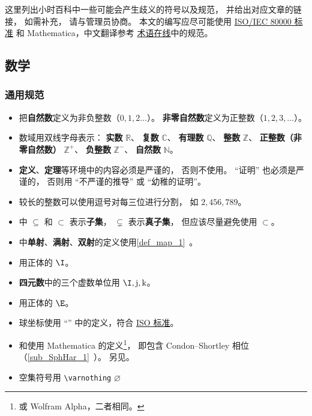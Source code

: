 
这里列出小时百科中一些可能会产生歧义的符号以及规范， 并给出对应文章的链接， 如需补充， 请与管理员协商。 本文的编写应尽可能使用 \href{https://en.wikipedia.org/wiki/ISO/IEC_80000}{ISO/IEC 80000 标准} 和 Mathematica，中文翻译参考 \href{https://www.termonline.cn/about}{术语在线}中的规范。

\subsection{数学}
\subsubsection{通用规范}
\begin{itemize}
\item 把\textbf{自然数}定义为非负整数（$0,1,2\dots$）。 \textbf{非零自然数}定义为正整数（$1,2,3,\dots$）。
\item 数域用双线字母表示： \textbf{实数} $\mathbb R$、 \textbf{复数} $\mathbb C$、 \textbf{有理数} $\mathbb Q$、 \textbf{整数} $\mathbb Z$、 \textbf{正整数（非零自然数）} $\mathbb Z^+$、 \textbf{负整数} $\mathbb Z^-$、 \textbf{自然数} $\mathbb N$。%
\item \textbf{定义}、\textbf{定理}等环境中的内容必须是严谨的， 否则不使用。 “证明” 也必须是严谨的， 否则用 “不严谨的推导” 或 “幼稚的证明”。
\item 较长的整数可以使用逗号对每三位进行分割， 如 $2,456,789$。
\item {}中 $\subseteq$ 和 $\subset$ 表示\textbf{子集}， $\subsetneq$ 表示\textbf{真子集}， 但应该尽量避免使用 $\subset$。
\item {}中\textbf{单射}、\textbf{满射}、\textbf{双射}的定义使用\autoref{def_map_1}~。
\item {} 用正体的 $\I$。
\item \textbf{四元数}中的三个虚数单位用 $\I, \mathrm{j}, \mathrm{k}$。
\item {} 用正体的 $\E$。
\item 球坐标使用 “” 中的定义，符合 \href{https://www.iso.org/standard/64973.html}{ISO 标准}。
\item {}和使用 Mathematica 的定义\footnote{或 Wolfram Alpha，二者相同。}， 即包含 Condon–Shortley 相位（\autoref{sub_SphHar_1}~）。 另见。
\item 空集符号用 \verb|\varnothing| $\varnothing$
\end{itemize}


